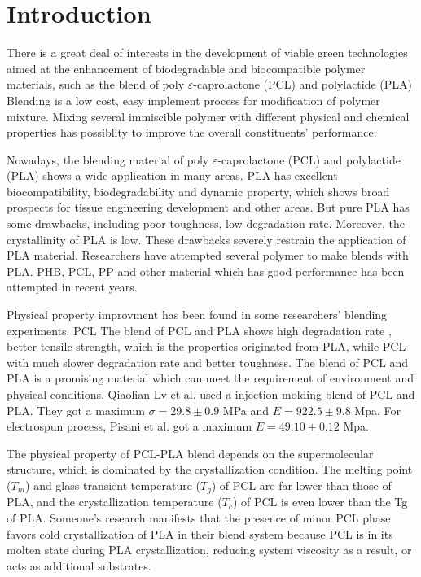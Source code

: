 \documentclass{article}%
\author{Fanyunyi}
\begin{document}
\linenumbers
\tableofcontents
  \enabstract{
  \lipsum[1]
  }
\section{Introduction} %
  There is a great deal of interests in the development of viable green technologies aimed at the enhancement of biodegradable and biocompatible polymer materials, such as the blend of poly $\varepsilon$-caprolactone (PCL) and polylactide (PLA)
  Blending is a low cost, easy implement process for modification of polymer mixture.
  Mixing several immiscible polymer with different physical and chemical properties has possiblity to improve the overall constituents' performance. 


  Nowadays, the blending material of poly $\varepsilon$-caprolactone (PCL) and polylactide (PLA) shows a wide application in many areas. 
  PLA has excellent biocompatibility, biodegradability and dynamic property, which shows broad prospects for tissue engineering development and other areas. 
  But pure PLA has some drawbacks, including poor toughness, low degradation rate.
  Moreover, the crystallinity of PLA is low.
  These drawbacks severely restrain the application of PLA material. 
  Researchers have attempted several polymer to make blends with PLA. 
  PHB, PCL, PP and other material which has good performance has been attempted in recent years. %


  Physical property improvment has been found in some researchers'  blending experiments. 
  PCL 
  The blend of PCL and PLA shows high degradation rate , better tensile strength, which is the properties originated from PLA, while PCL with much slower degradation rate and better toughness.
  The blend of PCL and PLA is a promising material which can meet the requirement of environment and physical conditions.
  Qiaolian Lv et al.\cite{RN73} used a injection molding blend of PCL and PLA.
  They got a maximum $\sigma=29.8\pm0.9$ MPa and $E=922.5\pm9.8$ Mpa. 
  For electrospun process, Pisani et al.\cite{RN58} got a maximum $E=49.10\pm0.12$ Mpa.


  The physical property of PCL-PLA blend depends on the supermolecular structure, which is dominated by the crystallization condition.
  The melting point ($T_m$) and glass transient temperature ($T_g$) of PCL are far lower than those of PLA, and the crystallization temperature ($T_c$) of PCL is even lower than the Tg of PLA. 
  Someone's research manifests that the presence of minor PCL phase favors cold crystallization of PLA in their blend system because PCL is in its molten state during PLA crystallization, reducing system viscosity as a result, or acts as additional substrates.
\end{document}
